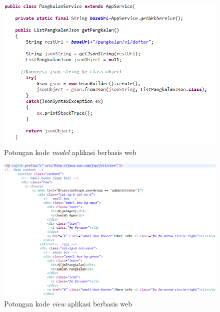 \begin{enumerate}[a.]
		\vspace{-0.4cm}
		\begin{figure}[H]
			\center
			\includegraphics [width = 14cm]{gambar/kode/model-web}
			\caption{Potongan kode \textit{model} aplikasi berbasis web}
			\label{modelWeb}
		\end{figure}
		
		\begin{figure}[H]
			\center
			\includegraphics [width = 15cm]{gambar/kode/view-web}
			\caption{Potongan kode \textit{view} aplikasi berbasis web}
			\label{viewWeb}
		\end{figure}
		

\end{enumerate}
